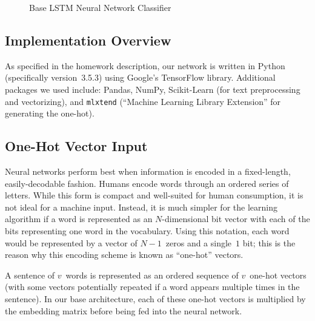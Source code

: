 \documentclass{report}
\begin{document}
\begin{figure}
    \caption{Base LSTM Neural Network Classifier}\label{fig:completeLstmClassifer}
  \end{figure}
  
  
  
  \subsection{Implementation Overview}\label{sec:implementation}
  
  As specified in the homework description, our network is written in Python (specifically version~3.5.3) using Google's TensorFlow library.  Additional packages we used include: Pandas, NumPy, Scikit-Learn (for text preprocessing and vectorizing), and \texttt{mlxtend} (``Machine Learning Library Extension'' for generating the one-hot). 
  
  \subsection{One-Hot Vector Input}\label{sec:oneHotVector}
  
  Neural networks perform best when information is encoded in a fixed-length, easily-decodable fashion.  Humans encode words through an ordered series of letters.  While this form is compact and well-suited for human consumption, it is not ideal for a machine input.  Instead, it is much simpler for the learning algorithm if a word is represented as an $N$-dimensional bit vector with each of the bits representing one word in the vocabulary.  Using this notation, each word would be represented by a vector of $N-1$~zeros and a single~$1$ bit; this is the reason why this encoding scheme is known as ``one-hot'' vectors.  
  
  A sentence of $v$~words is represented as an ordered sequence of $v$~one-hot vectors (with some vectors potentially repeated if a word appears multiple times in the sentence).  In our base architecture, each of these one-hot vectors is multiplied by the embedding matrix before being fed into the neural network.
  
\end{document}
